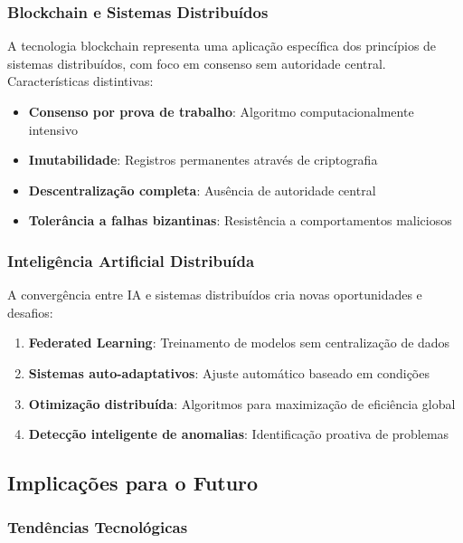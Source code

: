 \subsubsection{Blockchain e Sistemas Distribuídos}

A tecnologia blockchain representa uma aplicação específica dos princípios de sistemas distribuídos, com foco em consenso sem autoridade central. Características distintivas:

\begin{itemize}
    \item \textbf{Consenso por prova de trabalho}: Algoritmo computacionalmente intensivo
    \item \textbf{Imutabilidade}: Registros permanentes através de criptografia
    \item \textbf{Descentralização completa}: Ausência de autoridade central
    \item \textbf{Tolerância a falhas bizantinas}: Resistência a comportamentos maliciosos
\end{itemize}

\subsubsection{Inteligência Artificial Distribuída}

A convergência entre IA e sistemas distribuídos cria novas oportunidades e desafios:

\begin{enumerate}
    \item \textbf{Federated Learning}: Treinamento de modelos sem centralização de dados
    \item \textbf{Sistemas auto-adaptativos}: Ajuste automático baseado em condições
    \item \textbf{Otimização distribuída}: Algoritmos para maximização de eficiência global
    \item \textbf{Detecção inteligente de anomalias}: Identificação proativa de problemas
\end{enumerate}

\subsection{Implicações para o Futuro}

\subsubsection{Tendências Tecnológicas}

